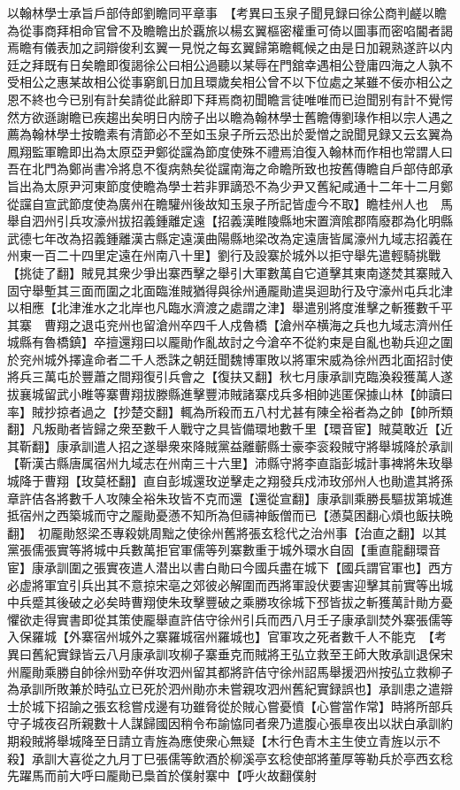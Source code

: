 以翰林學士承旨戶部侍郎劉瞻同平章事　【考異曰玉泉子聞見録曰徐公商判鹺以瞻為從事商拜相命官曾不及瞻瞻出於覊旅以楊玄翼樞密權重可倚以圖事而密啗閽者謁焉瞻有儀表加之詞辯俊利玄翼一見悦之每玄翼歸第瞻輒候之由是日加親熟遂許以内廷之拜既有日矣瞻即復謁徐公曰相公過聽以某辱在門舘幸遇相公登庸四海之人孰不受相公之惠某故相公從事窮飢日加且環歲矣相公曾不以下位處之某雖不佞亦相公之恩不終也今已别有計矣請從此辭即下拜焉商初聞瞻言徒唯唯而已迨聞别有計不覺愕然方欲遜謝瞻已疾趨出矣明日内牓子出以瞻為翰林學士舊瞻傳劉瑑作相以宗人遇之薦為翰林學士按瞻素有清節必不至如玉泉子所云恐出於愛憎之說聞見録又云玄翼為鳳翔監軍瞻即出為太原亞尹鄭從讜為節度使殊不禮焉洎復入翰林而作相也常謂人曰吾在北門為鄭尚書冷將息不復病熱矣從讜南海之命瞻所致也按舊傳瞻自戶部侍郎承旨出為太原尹河東節度使瞻為學士若非罪謫恐不為少尹又舊紀咸通十二年十二月鄭從讜自宣武節度使為廣州在瞻驩州後故知玉泉子所記皆虛今不取】瞻桂州人也　馬舉自泗州引兵攻濠州拔招義鍾離定遠【招義漢睢陵縣地宋置濟隂郡隋廢郡為化明縣武德七年改為招義鍾離漢古縣定遠漢曲陽縣地梁改為定遠唐皆属濠州九域志招義在州東一百二十四里定遠在州南八十里】劉行及設寨於城外以拒守舉先遣輕騎挑戰【挑徒了翻】賊見其衆少爭出寨西擊之舉引大軍數萬自它道擊其東南遂焚其寨賊入固守舉塹其三面而圍之北面臨淮賊猶得與徐州通龎勛遣吳迴助行及守濠州屯兵北津以相應【北津淮水之北岸也凡臨水濟渡之處謂之津】舉遣别將度淮擊之斬獲數千平其寨　曹翔之退屯兖州也留滄州卒四千人戍魯橋【滄州卒横海之兵也九域志濟州任城縣有魯橋鎮】卒擅還翔曰以龎勛作亂故討之今滄卒不從約束是自亂也勒兵迎之圍於兖州城外擇違命者二千人悉誅之朝廷聞魏博軍敗以將軍宋威為徐州西北面招討使將兵三萬屯於豐蕭之間翔復引兵會之【復扶又翻】秋七月康承訓克臨渙殺獲萬人遂拔襄城留武小睢等寨曹翔拔滕縣進擊豐沛賊諸寨戍兵多相帥逃匿保據山林【帥讀曰率】賊抄掠者過之【抄楚交翻】輒為所殺而五八村尤甚有陳全裕者為之帥【帥所類翻】凡叛勛者皆歸之衆至數千人戰守之具皆備環地數千里【環音宦】賊莫敢近【近其靳翻】康承訓遣人招之遂舉衆來降賊黨益離蘄縣士豪李衮殺賊守將舉城降於承訓【靳漢古縣唐属宿州九域志在州南三十六里】沛縣守將李直詣彭城計事裨將朱玫舉城降于曹翔【玫莫柸翻】直自彭城還玫逆擊走之翔發兵戍沛玫邠州人也勛遣其將孫章許佶各將數千人攻陳全裕朱玫皆不克而還【還從宣翻】康承訓乘勝長驅拔第城進抵宿州之西築城而守之龎勛憂懣不知所為但禱神飯僧而已【懣莫困翻心煩也飯扶晩翻】　初龎勛怒梁丕專殺姚周黜之使徐州舊將張玄稔代之治州事【治直之翻】以其黨張儒張實等將城中兵數萬拒官軍儒等列寨數重于城外環水自固【重直龍翻環音宦】康承訓圍之張實夜遣人潜出以書白勛曰今國兵盡在城下【國兵謂官軍也】西方必虚將軍宜引兵出其不意掠宋亳之郊彼必解圍而西將軍設伏要害迎擊其前實等出城中兵蹙其後破之必矣時曹翔使朱玫擊豐破之乘勝攻徐城下邳皆拔之斬獲萬計勛方憂懼欲走得實書即從其策使龎舉直許佶守徐州引兵而西八月壬子康承訓焚外寨張儒等入保羅城【外寨宿州城外之寨羅城宿州羅城也】官軍攻之死者數千人不能克　【考異曰舊紀實録皆云八月康承訓攻柳子寨垂克而賊將王弘立救至王師大敗承訓退保宋州龎勛乘勝自帥徐州勁卒倂攻泗州留其都將許佶守徐州詔馬舉援泗州按弘立救柳子為承訓所敗兼於時弘立已死於泗州勛亦未嘗親攻泗州舊紀實録誤也】承訓患之遣辯士於城下招諭之張玄稔嘗戍邊有功雖脅從於賊心嘗憂憤【心嘗當作常】時將所部兵守子城夜召所親數十人謀歸國因稍令布諭恊同者衆乃遣腹心張臯夜出以狀白承訓約期殺賊將舉城降至日請立青旌為應使衆心無疑【木行色青木主生使立青旌以示不殺】承訓大喜從之九月丁巳張儒等飲酒於柳溪亭玄稔使部將董厚等勒兵於亭西玄稔先躍馬而前大呼曰龎勛已梟首於僕射寨中【呼火故翻僕射